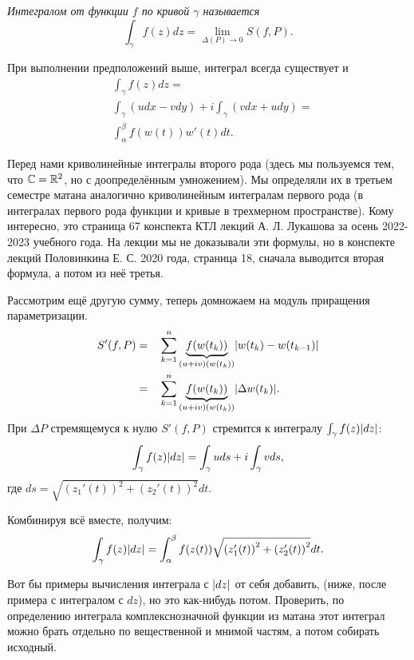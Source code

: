 \begin{definition}
	\it{Интегралом от функции $f$ по кривой $\gamma$} называется \[
		\int_\gamma f(z) dz = \lim_{\Delta(P) \to 0} S(f, P).
	\]
\end{definition}
\begin{note}
	При выполнении предположений выше, интеграл всегда существует и
	\begin{align*}
		& \int_\gamma f(z) dz = \\
		& \int_\gamma (u dx - v dy) + i \int_\gamma (v dx + u dy) = \\
		& \int_\alpha^\beta f(w(t)) w'(t) dt.
	\end{align*}
\end{note}
\begin{anote}
	Перед нами криволинейные интегралы второго рода (здесь мы пользуемся тем, что $\mathbb{C} = \mathbb{R}^2$, но с доопределённым умножением). Мы определяли их в третьем семестре матана аналогично криволинейным интегралам первого рода (в интегралах первого рода функции и кривые в трехмерном пространстве). Кому интересно, это страница 67 конспекта КТЛ лекций А. Л. Лукашова за осень 2022-2023 учебного года. На лекции мы не доказывали эти формулы, но в конспекте лекций Половинкина Е. С. 2020 года, страница 18, сначала выводится вторая формула, а потом из неё третья. 
\end{anote}

Рассмотрим ещё другую сумму, теперь домножаем на модуль приращения параметризации.
\[
	\begin{aligned}
		S'(f, P) = & && \sum_{k = 1}^n \underbrace{f(w(t_k))}_{(u+iv)(w(t_k))} \mathopen{}\left\lvert w(t_k) - w(t_{k - 1})\right\rvert\mathclose{}\\
		= & && \sum_{k = 1}^n \underbrace{f(w(t_k))}_{(u+iv)(w(t_k))} \mathopen{}\left\lvert\Delta w(t_k)\right\rvert\mathclose{}.
	\end{aligned}
\]
При $\Delta P$ стремящемуся к нулю $S'(f, P)$ стремится к интегралу $\int_\gamma f(z) \mathopen{}\left\lvert dz\right\rvert\mathclose{}$:
\[
	\int_\gamma f(z) \mathopen{}\left\lvert dz\right\rvert\mathclose{} = \int_\gamma u ds + i \int_\gamma v ds,
\]
где $ds = \sqrt{{(z_1'(t))}^2 + {(z_2'(t))}^2} dt$.

\begin{anote}
	Комбинируя всё вместе, получим:
	\[
		\int_\gamma f(z) \mathopen{}\left\lvert dz\right\rvert\mathclose{} = \int_\alpha^\beta f(z(t)) \sqrt{{(z_1'(t))}^2 + {(z_2'(t))}^2} dt.
	\]
\end{anote}

{\color{red} Вот бы примеры вычисления интеграла с $\mathopen{}\left\lvert dz\right\rvert\mathclose{}$ от себя добавить, (ниже, после примера с интегралом с $dz$), но это как-нибудь потом. Проверить, по определению интеграла комплекснозначной функции из матана этот интеграл можно брать отдельно по вещественной и мнимой частям, а потом собирать исходный.}

